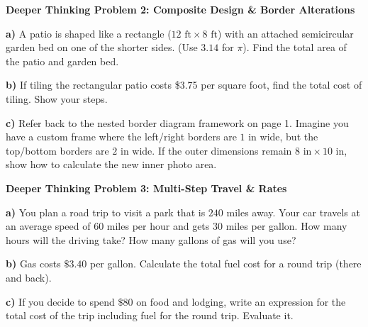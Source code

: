 \documentclass[12pt, letterpaper, fleqn]{article}
\begin{document}
\begin{tcolorbox}[colback=white, colframe=black, boxrule=1pt, arc=4mm, left=6mm, right=6mm, top=5mm, bottom=5mm]
\textbf{Deeper Thinking Problem 2: Composite Design \& Border Alterations}

\medskip

\noindent
\textbf{a)} A patio is shaped like a rectangle ($12\text{ ft} \times 8\text{ ft}$) with an attached semicircular garden bed on one of the shorter sides. (Use $3.14$ for $\pi$). Find the total area of the patio and garden bed.

\vspace{5cm}

\noindent
\textbf{b)} If tiling the rectangular patio costs \$3.75 per square foot, find the total cost of tiling. Show your steps.

\vspace{5cm}

\noindent
\textbf{c)} Refer back to the nested border diagram framework on page 1. Imagine you have a custom frame where the left/right borders are $1\text{ in}$ wide, but the top/bottom borders are $2\text{ in}$ wide. If the outer dimensions remain $8\text{ in} \times 10\text{ in}$, show how to calculate the new inner photo area. 

\vspace{5cm}
\end{tcolorbox}

\newpage

\begin{tcolorbox}[colback=white, colframe=black, boxrule=1pt, arc=4mm, left=6mm, right=6mm, top=5mm, bottom=5mm]
\textbf{Deeper Thinking Problem 3: Multi-Step Travel \& Rates}

\medskip

\noindent
\textbf{a)} You plan a road trip to visit a park that is $240$ miles away. Your car travels at an average speed of $60$ miles per hour and gets $30$ miles per gallon. How many hours will the driving take? How many gallons of gas will you use?

\vspace{5cm}

\noindent
\textbf{b)} Gas costs $\$3.40$ per gallon. Calculate the total fuel cost for a round trip (there and back).

\vspace{5cm}

\noindent
\textbf{c)} If you decide to spend $\$80$ on food and lodging, write an expression for the total cost of the trip including fuel for the round trip. Evaluate it.

\vspace{5cm}
\end{tcolorbox}
\end{document}
